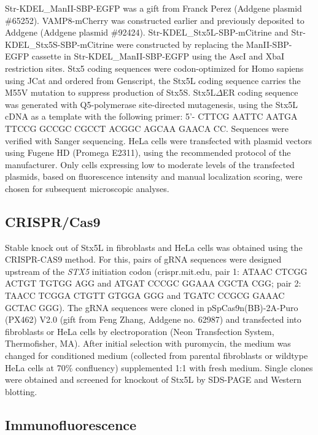Str-KDEL\_ManII-SBP-EGFP was a gift from Franck Perez (Addgene plasmid \#65252). VAMP8-mCherry was constructed earlier\cite{verboogen_fluorescence_2017} and previously deposited to Addgene (Addgene plasmid \#92424). Str-KDEL\_Stx5L-SBP-mCitrine and Str-KDEL\_Stx5S-SBP-mCitrine were constructed by replacing the ManII-SBP-EGFP cassette in Str-KDEL\_ManII-SBP-EGFP using the AscI and XbaI restriction sites. Stx5 coding sequences were codon-optimized for Homo sapiens using JCat and ordered from Genscript, the Stx5L coding sequence carries the M55V mutation to suppress production of Stx5S. Stx5L$\Delta$ER coding sequence was generated with Q5-polymerase site-directed mutagenesis, using the Stx5L cDNA as a template with the following primer: 5’- CTTCG AATTC AATGA TTCCG GCCGC CGCCT ACGGC AGCAA GAACA CC. Sequences were verified with Sanger sequencing. HeLa cells were transfected with plasmid vectors using Fugene HD (Promega E2311), using the recommended protocol of the manufacturer. Only cells expressing low to moderate levels of the transfected plasmids, based on fluorescence intensity and manual localization scoring, were chosen for subsequent microscopic analyses.

\subsection{CRISPR/Cas9}

Stable knock out of Stx5L in fibroblasts and HeLa cells was obtained using the CRISPR-CAS9 method. For this, pairs of gRNA sequences were designed upstream of the \emph{STX5} initiation codon (crispr.mit.edu, pair 1: ATAAC CTCGG ACTGT TGTGG AGG and ATGAT CCCGC GGAAA CGCTA CGG; pair 2: TAACC TCGGA CTGTT GTGGA GGG and TGATC CCGCG GAAAC GCTAC GGG). The gRNA sequences were cloned in pSpCas9n(BB)-2A-Puro (PX462) V2.0 (gift from Feng Zhang, Addgene no. 62987)\cite{ran_genome_2013} and transfected into fibroblasts or HeLa cells by electroporation (Neon Transfection System, Thermofisher, MA). After initial selection with puromycin, the medium was changed for conditioned medium (collected from parental fibroblasts or wildtype HeLa cells at 70\% confluency) supplemented 1:1 with fresh medium. Single clones were obtained and screened for knockout of Stx5L by SDS-PAGE and Western blotting.

\subsection{Immunofluorescence}

